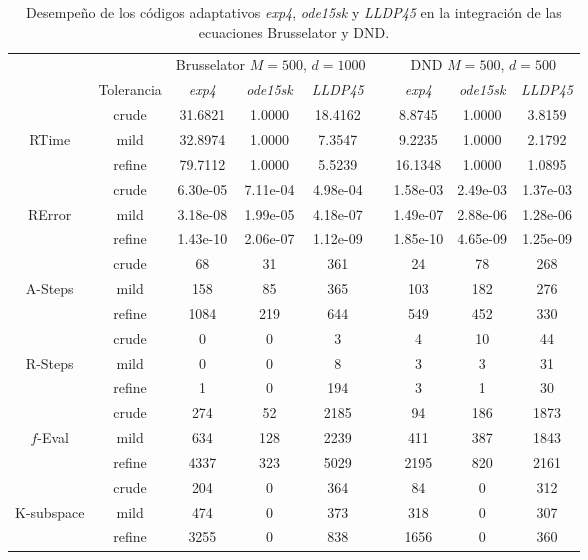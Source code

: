 \begin{table}[htb]
	\caption{Desempeño de los códigos  adaptativos \emph{exp4}, \emph{ode15sk} y \emph{LLDP45} en la integración de las ecuaciones Brusselator y DND.}
	\begin{adjustbox}{width=0.8\columnwidth,center}
\begin{tabular}{  ccccccccc }
    \hline
    & & \multicolumn{3}{c}{Brusselator $M=500$, $d=1000$ } & & \multicolumn{3}{c}{DND $M=500$, $d=500$}\\
    \cline{3-5} \cline{7-9}
    & Tolerancia & \emph{exp4} & \emph{ode15sk} & \emph{LLDP45} & & \emph{exp4} & \emph{ode15sk} & \emph{LLDP45} \\
    \hline
    & crude & 31.6821 & 1.0000 & 18.4162 &  & 8.8745 & 1.0000 & 3.8159 \\
    RTime & mild & 32.8974 & 1.0000 & 7.3547 &  & 9.2235 & 1.0000 & 2.1792 \\
    & refine & 79.7112 & 1.0000 & 5.5239 &  & 16.1348 & 1.0000 & 1.0895 \\
    \hline
    & crude & 6.30e-05 & 7.11e-04 & 4.98e-04 &  & 1.58e-03 & 2.49e-03 & 1.37e-03 \\
    RError & mild & 3.18e-08 & 1.99e-05 & 4.18e-07 &  & 1.49e-07 & 2.88e-06 & 1.28e-06 \\
    & refine & 1.43e-10 & 2.06e-07 & 1.12e-09 &  & 1.85e-10 & 4.65e-09 & 1.25e-09 \\
    \hline
    & crude & 68 & 31 & 361 &  & 24 & 78 & 268 \\
    A-Steps & mild & 158 & 85 & 365 &  & 103 & 182 & 276 \\
    & refine & 1084 & 219 & 644 &  & 549 & 452 & 330 \\
    \hline
    & crude & 0 & 0 & 3 &  & 4 & 10 & 44 \\
    R-Steps & mild & 0 & 0 & 8 &  & 3 & 3 & 31 \\
    & refine & 1 & 0 & 194 &  & 3 & 1 & 30 \\
    \hline
    & crude & 274 & 52 & 2185 &  & 94 & 186 & 1873 \\
    $f$-Eval & mild & 634 & 128 & 2239 &  & 411 & 387 & 1843 \\
    & refine & 4337 & 323 & 5029 &  & 2195 & 820 & 2161 \\
    \hline
    & crude & 204 & 0 & 364 &  & 84 & 0 & 312 \\
    K-subspace & mild & 474 & 0 & 373 &  & 318 & 0 & 307 \\
    & refine & 3255 & 0 & 838 &  & 1656 & 0 & 360 \\

\end{tabular}
\end{adjustbox}
\end{table}
